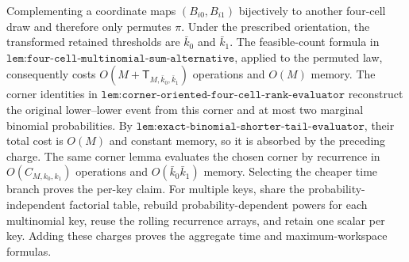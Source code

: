Complementing a coordinate maps \((B_{i0},B_{i1})\) bijectively to another four-cell draw and therefore only permutes \(\pi\). Under the prescribed orientation, the transformed retained thresholds are \(\bar k_0\) and \(\bar k_1\). The feasible-count formula in \(\texttt{lem:four-cell-multinomial-sum-alternative}\), applied to the permuted law, consequently costs \(O(M+\mathsf T_{M,\bar k_0,\bar k_1})\) operations and \(O(M)\) memory. The corner identities in \(\texttt{lem:corner-oriented-four-cell-rank-evaluator}\) reconstruct the original lower--lower event from this corner and at most two marginal binomial probabilities. By \(\texttt{lem:exact-binomial-shorter-tail-evaluator}\), their total cost is \(O(M)\) and constant memory, so it is absorbed by the preceding charge. The same corner lemma evaluates the chosen corner by recurrence in \(O(C_{M,k_0,k_1})\) operations and \(O(\bar k_0\bar k_1)\) memory. Selecting the cheaper time branch proves the per-key claim. For multiple keys, share the probability-independent factorial table, rebuild probability-dependent powers for each multinomial key, reuse the rolling recurrence arrays, and retain one scalar per key. Adding these charges proves the aggregate time and maximum-workspace formulas.